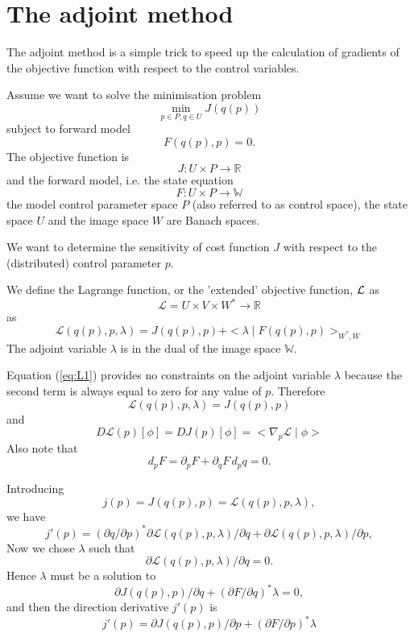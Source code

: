 \documentclass[10pt,a4paper]{book}
\newcommand{\p}{\partial}
\begin{document}
\section{The adjoint method}


The adjoint method is a simple trick to speed up the calculation of
gradients of the objective function with respect to the control variables. 

Assume we want to solve the minimisation problem
\[
\min_{p \in P, q \in U } J(q(p)) 
\]
subject to forward model
\[     
F(q(p),p)=0.
\]
The objective function is
\[
J : U \times P \to \mathbb{R}
\]
and the forward model, i.e. the state equation
\[
F : U \times P \to \mathbb{W}
\]
the model control parameter space $P$ (also referred to as control space), the
state space $U$ and the image space $W$ are Banach spaces.



We want to determine the sensitivity of cost function $J$ with respect
to the (distributed) control parameter $p$. 



We define the Lagrange function, or the 'extended' objective function, $\cal L$ as 
\[
\mathcal{L}= U \times V \times W^\ast \to \mathbb{R} 
\]
as
\begin{equation} 
\mathcal{L}(q(p),p,\lambda)=J(q(p),p)+<\lambda \mid F(q(p),p) >_{W^\ast ,W}
\label{eq:L1}
\end{equation}
The adjoint variable $\lambda$ is in the dual of the image space $\mathbb{W}$.

Equation (\ref{eq:L1}) provides no constraints on the adjoint variable $\lambda$ because the
second term is always equal to zero for any value of $p$. 
Therefore
\[
\mathcal{L}(q(p),p,\lambda)=J(q(p),p)
\]
and
\[
D \mathcal{L}(p)[\phi] = D J(p)[\phi] =  <\nabla_p \mathcal{L}  \mid \phi >  
\]
Also note that 
\[
d_p F= \p_p F + \p_q F \, d_p q =0  .
\]


Introducing
\[
j(p)=J(q(p),p)= \mathcal{L}(q(p),p,\lambda),
\]
we have
\begin{equation}
j'(p)= (\p q / \p p )^\ast \p \mathcal{L}(q(p),p,\lambda)/\p q + \p \mathcal{L}(q(p),p,\lambda)/ \p p ,
\label{eq:dj1}
\end{equation}
Now we chose $\lambda$ such that 
\[
\p \mathcal{L}(q(p),p,\lambda)/ \p q=0 .
\]
Hence $\lambda$ must be a solution to
\[
\p J(q(p),p) / \p q + (\p F/\p q)^\ast \lambda=0 ,
\]
and then the direction derivative $j'(p)$ is
\begin{equation}
j'(p)= \p J(q(p),p)/ \p p + (\p F / \p p)^\ast  \lambda
\label{eq:dder}
\end{equation}
\end{document}
